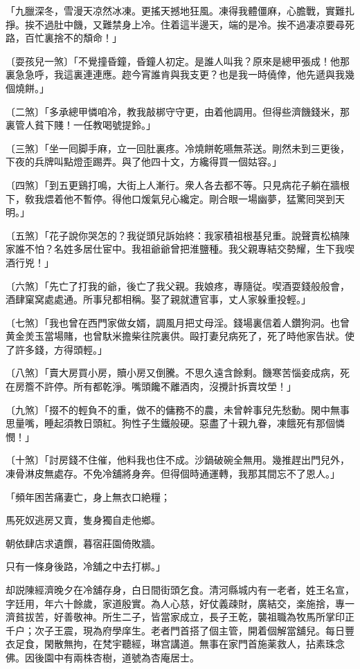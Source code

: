 \begin{myquote}
「九臘深冬，雪漫天凉然冰凍。更搖天撼地狂風。凍得我體僵麻，心膽戰，實難扎掙。挨不過肚中饑，又難禁身上冷。住着這半邊天，端的是冷。挨不過凄凉要尋死路，百忙裏捨不的頽命！」

{\markfont〔耍孩兒一煞〕}「不覺撞昏鐘，昏鐘人初定。是誰人叫我？原來是總甲張成！他那裏急急呼，我這裏連連應。趂今宵誰肯與我支更？也是我一時僥倖，他先遞與我幾個燒餅。」

{\markfont〔二煞〕}「多承總甲憐咱冷，教我敲梆守守更，由着他調用。但得些濟饑錢米，那裏管人貧下賤！一任教喝號提鈴。」

{\markfont〔三煞〕}「坐一囘脚手麻，立一回肚裏疼。冷燒餅乾嚥無茶送。剛然未到三更後，下夜的兵牌叫點燈歪踢弄。與了他四十文，方纔得買一個姑容。」

{\markfont〔四煞〕}「到五更鷄打鳴，大街上人漸行。衆人各去都不等。只見病花子躺在牆根下，敎我煨着他不暫停。得他口煖氣兒心纔定。剛合眼一場幽夢，猛驚囘哭到天明。」

{\markfont〔五煞〕}「花子說你哭怎的？我従頭兒訴始終：我家積祖根基兒重。說聲賣松槁陳家誰不怕？名姓多居仕宦中。我祖爺爺曾把淮鹽種。我父親專結交勢耀，生下我喫酒行兇！」

{\markfont〔六煞〕}「先亡了打我的爺，後亡了我父親。我娘疼，專隨従。喫酒耍錢般般會，酒肆窠窝處處通。所事兒都相稱。娶了親就遭官事，丈人家躲重投輕。」

{\markfont〔七煞〕}「我也曾在西門家做女婿，調風月把丈母淫。錢場裏信着人鑽狗洞。也曾黄金羙玉當場賭，也曾馱米擔柴往院裏供。毆打妻兒病死了，死了時他家告狀。使了許多錢，方得頭輕。」

{\markfont〔八煞〕}「賣大房買小房，贖小房又倒騰。不思久遠含餘剩。饑寒苦惱妾成病，死在房簷不許停。所有都乾淨。嘴頭饞不離酒肉，沒攪計拆賣坟塋！」

{\markfont〔九煞〕}「掇不的輕負不的重，做不的傭務不的農，未曾幹事兒先愁動。閑中無事思量嘴，睡起須教日頭紅。狗性子生鐵般硬。惡盡了十親九眷，凍餓死有那個憐憫！」

{\markfont〔十煞〕}「討房錢不住催，他料我也住不成。沙鍋破碗全無用。幾推趕出門兒外，凍骨淋皮無處存。不免冷舖將身奔。但得個時通運轉，我那其間忘不了恩人。」

「頻年困苦痛妻亡，身上無衣口絶糧；

馬死奴逃房又賣，隻身獨自走他鄉。

朝依肆店求遺饌，暮宿莊園倚敗牆。

只有一條身後路，冷舖之中去打梆。」
\end{myquote}

却説陳經濟晚夕在冷舖存身，白日間街頭乞食。清河縣城内有一老者，姓王名宣，字廷用，年六十餘歲，家道殷實。為人心慈，好仗義疎財，廣結交，楽施捨，專一濟貧拔苦，好善敬神。所生二子，皆當家成立，長子王乾，襲祖職為牧馬所掌印正千户；次子王震，現為府學庠生。老者門首搭了個主管，開着個解當舖兒。每日豐衣足食，閑散無拘，在梵宇聽經，琳宫講道。無事在家門首施薬救人，拈素珠念佛。因後園中有兩株杏樹，道號為杏庵居士。

